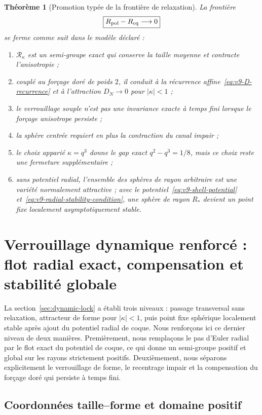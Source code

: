 \documentclass[11pt,a4paper]{article}
\newtheorem{theorem}{Théorème}[section]
\begin{document}
\begin{theorem}[Promotion typée de la frontière de relaxation]\label{thm:v9-promotion}
La frontière
\[
 \boxed{R_{\rm pol}-R_{\rm eq}\longrightarrow0}
\]
se ferme comme suit dans le modèle déclaré :
\begin{enumerate}[label=\textup{(\roman*)}]
\item $\mathcal R_\kappa$ est un semi-groupe exact qui conserve la taille moyenne et contracte l'anisotropie ;
\item couplé au forçage doré de poids $2$, il conduit à la récurrence affine~\eqref{eq:v9-D-recurrence} et à l'attraction $D_N\to0$ pour $|\kappa|<1$ ;
\item le verrouillage souple n'est pas une invariance exacte à temps fini lorsque le forçage anisotrope persiste ;
\item la sphère centrée requiert en plus la contraction du canal impair ;
\item le choix apparié $\kappa=q^3$ donne le gap exact $q^2-q^3=1/8$, mais ce choix reste une fermeture supplémentaire ;
\item sans potentiel radial, l'ensemble des sphères de rayon arbitraire est une variété normalement attractive ; avec le potentiel~\eqref{eq:v9-shell-potential} et~\eqref{eq:v9-radial-stability-condition}, une sphère de rayon $R_*$ devient un point fixe localement asymptotiquement stable.
\end{enumerate}
\end{theorem}



\section{Verrouillage dynamique renforcé : flot radial exact, compensation et stabilité globale}\label{sec:v10-global-lock}

La section~\ref{sec:dynamic-lock} a établi trois niveaux : passage transversal sans relaxation, attracteur de forme pour $|\kappa|<1$, puis point fixe sphérique localement stable après ajout du potentiel radial de coque. Nous renforçons ici ce dernier niveau de deux manières. Premièrement, nous remplaçons le pas d'Euler radial par le flot exact du potentiel de coque, ce qui donne un semi-groupe positif et global sur les rayons strictement positifs. Deuxièmement, nous séparons explicitement le verrouillage de forme, le recentrage impair et la compensation du forçage doré qui persiste à temps fini.

\subsection{Coordonnées taille--forme et domaine positif}
\end{document}
